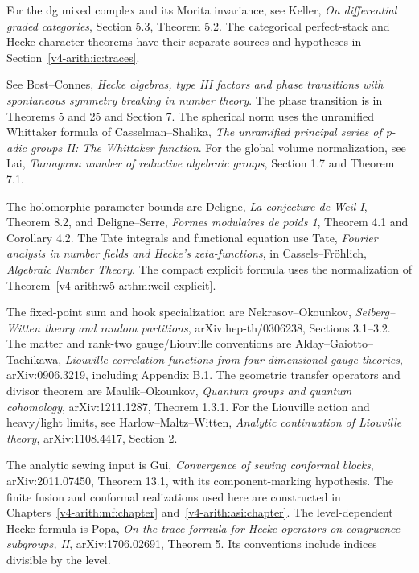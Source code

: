 For the dg mixed complex and its Morita invariance, see Keller, \emph{On
differential graded categories}, Section 5.3, Theorem 5.2. The categorical
perfect-stack and Hecke character theorems have their separate sources and
hypotheses in Section~\ref{v4-arith:ic:traces}.

See Bost--Connes, \emph{Hecke algebras, type III factors and phase
transitions with spontaneous symmetry breaking in number theory}.
The phase transition is in Theorems 5 and 25 and Section 7. The spherical norm uses the unramified
Whittaker formula of Casselman--Shalika, \emph{The unramified principal
series of p-adic groups II: The Whittaker function}. For the global volume
normalization, see Lai, \emph{Tamagawa number of reductive algebraic
groups}, Section 1.7 and Theorem 7.1.

The holomorphic parameter bounds are Deligne, \emph{La conjecture de Weil
I}, Theorem 8.2, and Deligne--Serre, \emph{Formes modulaires de poids 1},
Theorem 4.1 and Corollary 4.2. The Tate integrals and functional equation
use Tate, \emph{Fourier analysis in number fields and Hecke's
zeta-functions}, in Cassels--Fr\"ohlich, \emph{Algebraic Number Theory}. The
compact explicit formula uses the normalization of
Theorem~\ref{v4-arith:w5-a:thm:weil-explicit}.

The fixed-point sum and hook specialization are Nekrasov--Okounkov,
\emph{Seiberg--Witten theory and random partitions}, arXiv:hep-th/0306238,
Sections 3.1--3.2. The matter and rank-two gauge/Liouville conventions are
Alday--Gaiotto--Tachikawa, \emph{Liouville correlation functions from
four-dimensional gauge theories}, arXiv:0906.3219, including Appendix B.1.
The geometric transfer operators and divisor theorem are Maulik--Okounkov,
\emph{Quantum groups and quantum cohomology}, arXiv:1211.1287, Theorem
1.3.1. For the Liouville action and heavy/light limits, see
Harlow--Maltz--Witten, \emph{Analytic continuation of Liouville theory},
arXiv:1108.4417, Section 2.

The analytic sewing input is Gui, \emph{Convergence of sewing conformal
blocks}, arXiv:2011.07450, Theorem 13.1, with its component-marking
hypothesis. The finite fusion and conformal realizations used here are
constructed in Chapters~\ref{v4-arith:mf:chapter}
and~\ref{v4-arith:asi:chapter}. The level-dependent Hecke formula is Popa,
\emph{On the trace formula for Hecke operators on congruence subgroups, II},
arXiv:1706.02691, Theorem 5. Its conventions include indices divisible by
the level.
